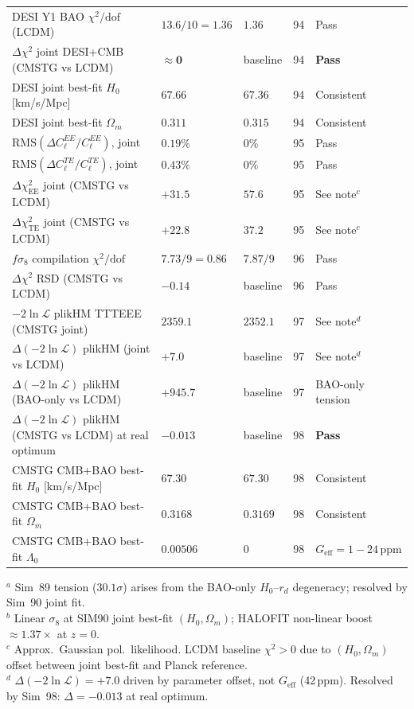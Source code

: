 \documentclass[12pt,a4paper]{article}
\begin{document}
\begin{table}[ht]
\begin{tabular}{p{}p{}p{}@{\hspace{4pt}}c@{\hspace{4pt}}p{}}
DESI Y1 BAO $\chi^2/\mathrm{dof}$ (LCDM) & $13.6/10 = 1.36$ & $1.36$ & 94 & Pass \\
$\Delta\chi^2$ joint DESI+CMB (CMSTG vs LCDM) & $\mathbf{\approx 0}$ & baseline & 94 & \textbf{Pass} \\
DESI joint best-fit $H_0$ [km/s/Mpc] & $67.66$ & $67.36$ & 94 & Consistent \\
DESI joint best-fit $\Omega_m$ & $0.311$ & $0.315$ & 94 & Consistent \\
$\mathrm{RMS}(\Delta C_\ell^{EE}/C_\ell^{EE})$, joint & $0.19\%$ & $0\%$ & 95 & Pass \\
$\mathrm{RMS}(\Delta C_\ell^{TE}/C_\ell^{TE})$, joint & $0.43\%$ & $0\%$ & 95 & Pass \\
$\Delta\chi^2_\mathrm{EE}$ joint (CMSTG vs LCDM) & $+31.5$ & $57.6$ & 95 & See note$^c$ \\
$\Delta\chi^2_\mathrm{TE}$ joint (CMSTG vs LCDM) & $+22.8$ & $37.2$ & 95 & See note$^c$ \\
$f\sigma_8$ compilation $\chi^2/\mathrm{dof}$ & $7.73/9=0.86$ & $7.87/9$ & 96 & Pass \\
$\Delta\chi^2$ RSD (CMSTG vs LCDM) & $-0.14$ & baseline & 96 & Pass \\
$-2\ln\mathcal{L}$ plikHM TTTEEE (CMSTG joint) & $2359.1$ & $2352.1$ & 97 & See note$^d$ \\
$\Delta(-2\ln\mathcal{L})$ plikHM (joint vs LCDM) & $+7.0$ & baseline & 97 & See note$^d$ \\
$\Delta(-2\ln\mathcal{L})$ plikHM (BAO-only vs LCDM) & $+945.7$ & baseline & 97 & BAO-only tension \\
\midrule
$\Delta(-2\ln\mathcal{L})$ plikHM (CMSTG vs LCDM) at real optimum & $\mathbf{-0.013}$ & baseline & 98 & \textbf{Pass} \\
CMSTG CMB+BAO best-fit $H_0$ [km/s/Mpc] & $67.30$ & $67.30$ & 98 & Consistent \\
CMSTG CMB+BAO best-fit $\Omega_m$ & $0.3168$ & $0.3169$ & 98 & Consistent \\
CMSTG CMB+BAO best-fit $\Lambda_0$ & $0.00506$ & $0$ & 98 & $G_\mathrm{eff}=1-24\,\mathrm{ppm}$ \\
\bottomrule
\end{tabular}
\medskip\noindent
{\footnotesize
$^a$ Sim~89 tension ($30.1\sigma$) arises from the BAO-only $H_0$--$r_d$ degeneracy; resolved by Sim~90 joint fit.\\
$^b$ Linear $\sigma_8$ at SIM90 joint best-fit $(H_0,\Omega_m)$; HALOFIT non-linear boost $\approx 1.37\times$ at $z=0$.\\
$^c$ Approx.\ Gaussian pol.\ likelihood. LCDM baseline $\chi^2>0$ due to $(H_0,\Omega_m)$ offset between joint best-fit and Planck reference.\\
$^d$ $\Delta(-2\ln\mathcal{L})=+7.0$ driven by parameter offset, not $G_\mathrm{eff}$ (42\,ppm). Resolved by Sim~98: $\Delta=-0.013$ at real optimum.
}
\end{table}
\end{document}
